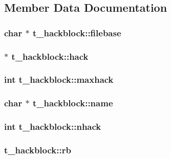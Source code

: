 \subsection{\-Member \-Data \-Documentation}
\hypertarget{structt__hackblock_a912af54e9f133a63ecfdb10588159632}{
\subsubsection[{filebase}]{\setlength{\rightskip}{0pt plus 5cm}char $\ast$ {\bf t\-\_\-hackblock\-::filebase}}}\label{structt__hackblock_a912af54e9f133a63ecfdb10588159632}
\hypertarget{structt__hackblock_aa0d7d0329d37f7384c7ee18f4cce35ea}{
\subsubsection[{hack}]{ $\ast$ {\bf t\-\_\-hackblock\-::hack}}}\label{structt__hackblock_aa0d7d0329d37f7384c7ee18f4cce35ea}
\hypertarget{structt__hackblock_a4bde750e964691cfc69f913cb253fc53}{
\subsubsection[{maxhack}]{\setlength{\rightskip}{0pt plus 5cm}int {\bf t\-\_\-hackblock\-::maxhack}}}\label{structt__hackblock_a4bde750e964691cfc69f913cb253fc53}
\hypertarget{structt__hackblock_abeb839d3d420dcabb58d2c0bb0b82fe3}{
\subsubsection[{name}]{\setlength{\rightskip}{0pt plus 5cm}char $\ast$ {\bf t\-\_\-hackblock\-::name}}}\label{structt__hackblock_abeb839d3d420dcabb58d2c0bb0b82fe3}
\hypertarget{structt__hackblock_a8965345a2da601395c5d376c4317916d}{
\subsubsection[{nhack}]{\setlength{\rightskip}{0pt plus 5cm}int {\bf t\-\_\-hackblock\-::nhack}}}\label{structt__hackblock_a8965345a2da601395c5d376c4317916d}
\hypertarget{structt__hackblock_aab9b5e1c561813d03174820e9418dd45}{
\subsubsection[{rb}]{ {\bf t\-\_\-hackblock\-::rb}}}\label{structt__hackblock_aab9b5e1c561813d03174820e9418dd45}


